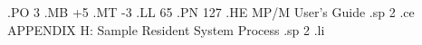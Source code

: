 .PO 3
.MB +5
.MT -3
.LL 65
.PN 127
.HE MP/M User's Guide
.sp 2
.ce
APPENDIX H:  Sample Resident System Process
.sp 2
.li
